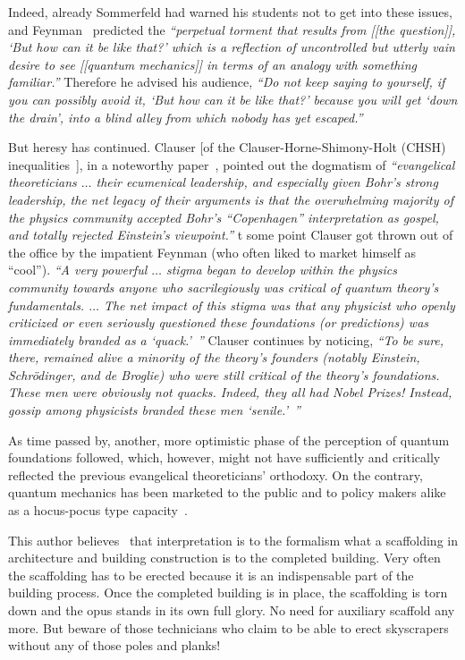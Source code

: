 Indeed, already Sommerfeld had warned his students not to get
into these issues,
and
Feynman~\cite[p.~129]{feynman-law}
predicted the  {\em ``perpetual torment that results
from [[the question]], `But how can it be like that?' which
is a reflection of uncontrolled but utterly vain desire to see
[[quantum mechanics]] in terms of an analogy with something familiar.''}
Therefore he advised
his audience, {\em
``Do not keep saying to yourself, if you can possibly avoid it,
`But how can it be like that?'
because you will get `down the drain', into a blind alley from which nobody has yet
escaped.''}

But heresy has continued.
Clauser [of the Clauser-Horne-Shimony-Holt (CHSH) inequalities~\cite{chsh}],
in a noteworthy paper~\cite{clauser-talkvie},
pointed out the dogmatism of {\em ``evangelical theoreticians
$\ldots$
their ecumenical leadership, and especially given
Bohr's strong leadership, the net legacy of their arguments is that the overwhelming
majority of the physics community accepted Bohr's ``Copenhagen''
interpretation as gospel, and totally rejected Einstein's viewpoint.''}
t some point Clauser got thrown out of the office by the impatient Feynman
(who often liked to market himself as ``cool'').
{\em ``A very powerful $\ldots$ stigma began to develop within the physics
community towards anyone who sacrilegiously was critical of quantum theory's
fundamentals. $\ldots$  The net impact of this stigma was
that any physicist who openly criticized or even seriously questioned these
foundations (or predictions) was immediately branded as a `quack.'~''}
Clauser continues by noticing,
{\em ``To be sure, there, remained alive a minority of the theory's founders
(notably Einstein, Schr\"odinger, and de Broglie) who were still critical of the
theory's foundations. These men were obviously not quacks. Indeed, they
all had Nobel Prizes! Instead, gossip among physicists branded these men
`senile.'~''}

As time passed by, another, more optimistic phase of the perception of quantum foundations followed,
which, however, might not have sufficiently and critically reflected
the previous evangelical  theoreticians' orthodoxy.
On the contrary, quantum mechanics has been marketed to the public and to policy makers alike as a
hocus-pocus type capacity~\cite{svozil-2016-quantum-hokus-pokus}.

This author believes~\cite{svozil-2002-noiq}
that interpretation is to the formalism
what a scaffolding in architecture and
building construction is to the completed building.
Very often the scaffolding has to be erected because
it is an indispensable part of the building process.
Once the completed building is in place, the scaffolding is torn down and
the opus stands in its own full glory.
No need for auxiliary scaffold any more.
But beware of those technicians who claim to be able to erect
skyscrapers
without any of those poles and planks!

